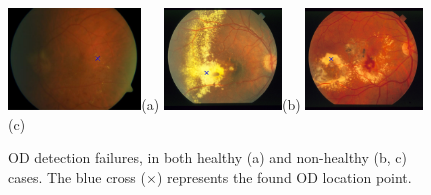 \begin{figure}[!htbp]
    \centering

	\includegraphics[height=2.7cm]{Images/Methode/Detection/failures/failure4.jpg}{(a)}
	\includegraphics[height=2.7cm]{Images/Methode/Detection/failures/failure2.jpg}{(b)}
	\includegraphics[height=2.7cm]{Images/Methode/Detection/failures/failure1.jpg}{(c)}
	
\caption{\label{examples_detection_failures} OD detection failures, in both healthy (a) and non-healthy (b, c) cases. The blue cross ($\times$) represents the found OD location point.}
\end{figure}
